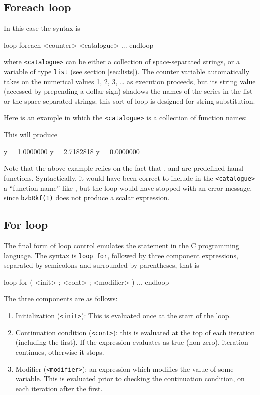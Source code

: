 \subsection{Foreach loop}
\label{sec:loop-foreach}

In this case the syntax is
\begin{code}
loop foreach <counter> <catalogue>
   ...
endloop
\end{code}
where \texttt{<catalogue>} can be either a collection of
space-separated strings, or a variable of type \texttt{list} (see
section \ref{sec:lists}). The counter variable automatically takes on
the numerical values 1, 2, 3, \dots{} as execution proceeds, but its
string value (accessed by prepending a dollar sign) shadows the names
of the series in the list or the space-separated strings; this sort of
loop is designed for string substitution.

Here is an example in which the \texttt{<catalogue>} is a collection
of function names: 
This will produce
\begin{code}
              y =  1.0000000
              y =  2.7182818
              y =  0.0000000
\end{code}
Note that the above example relies on the fact that ,
 and  are predefined hansl functions. Syntactically,
it would have been correct to include in the \texttt{<catalogue>} a
``function name'' like , but the loop would have stopped
with an error message, since \texttt{bzbRkf(1)} does not produce a
scalar expression.

\subsection{For loop}

The final form of loop control emulates the  statement in the
C programming language.  The syntax is \texttt{loop for}, followed by
three component expressions, separated by semicolons and surrounded by
parentheses, that is
\begin{code}
loop for ( <init> ; <cont> ; <modifier> )
   ...
endloop
\end{code}

The three components are as follows:
\begin{enumerate}
\item Initialization (\texttt{<init>}): This is evaluated once at the
  start of the loop.
\item Continuation condition (\texttt{<cont>}): this is evaluated at
  the top of each iteration (including the first).  If the expression
  evaluates as true (non-zero), iteration continues, otherwise it
  stops. 
\item Modifier (\texttt{<modifier>}): an expression which modifies the
  value of some variable.  This is evaluated prior to checking the
  continuation condition, on each iteration after the first.
\end{enumerate}

